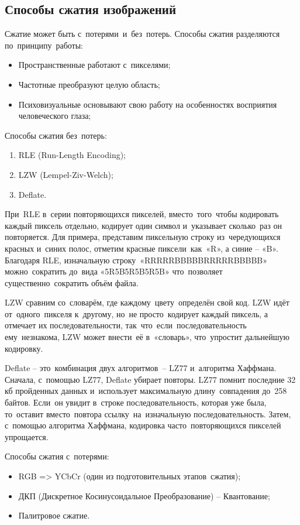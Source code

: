 \documentclass{ou}
\begin{document}
\subsection{Способы сжатия изображений}
Сжатие может быть с~потерями~и~без~потерь. Способы сжатия разделяются по~принципу~работы:
\begin{itemize}[label=-, leftmargin=0em, itemindent=3.35em, nosep]
\item Пространственные работают с~пикселями;
\item Частотные преобразуют целую область;
\item Психовизуальные основывают свою работу на особенностях восприятия человеческого глаза;
\end{itemize}

Способы сжатия без~потерь:
\begin{enumerate}[leftmargin=0em, itemindent=3.75em, nosep, label=\arabic*)]
\item RLE (Run-Length Encoding);
\item LZW (Lempel-Ziv-Welch);
\item Deflate.
\end{enumerate}

При~RLE в~серии повторяющихся пикселей, вместо~того~чтобы кодировать каждый пиксель отдельно, кодирует один символ и~указывает сколько~раз он повторяется. Для примера, представим пиксельную строку из~чередующихся красных и~синих полос, отметим красные пиксели~как~«R», а синие -- «B». Благодаря RLE, изначальную строку~«RRRRR\allowbreak BBBBB\allowbreak RRRRR\allowbreak BBBBB» можно~сократить до~вида «5R5B5R5B5R5B» что~позволяет существенно~сократить объём файла.

LZW сравним со~словарём, где каждому~цвету~определён свой код. LZW идёт от~одного~пикселя к~другому, но~не просто~кодирует каждый пиксель, а отмечает их последовательности, так~что~если~последовательность ему~незнакома, LZW может внести~её в~«словарь», что~упростит дальнейшую кодировку.

Deflate -- это~комбинация двух алгоритмов~-- LZ77 и~алгоритма Хаффмана. Сначала, с~помощью LZ77, Deflate убирает повторы. LZ77 помнит последние 32 кб пройденных данных и~использует максимальную длину~совпадения до~258 байтов. Если~он увидит в~строке последовательность, которая уже была, то~оставит вместо~повтора ссылку~на~изначальную последовательность. Затем, с~помощью алгоритма Хаффмана, кодировка часто~повторяющихся пикселей упрощается.

Способы сжатия с~потерями:
\begin{itemize}[label=-, leftmargin=0em, itemindent=3.35em, nosep]
  \item RGB => YCbCr (один из подготовительных этапов~сжатия);
  \item ДКП (Дискретное Косинусоидальное Преобразование) – Квантование;
  \item Палитровое сжатие.
\end{itemize}
\end{document}
